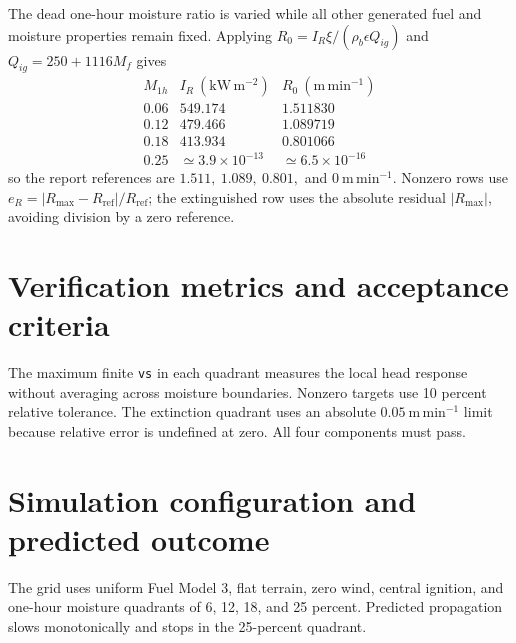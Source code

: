 The dead one-hour moisture ratio is varied while all other generated fuel
and moisture properties remain fixed.  Applying
\(R_0=I_R\xi/(\rho_b\epsilon Q_{ig})\) and
\(Q_{ig}=250+1116M_f\) gives
\[
\begin{array}{c|cc}
M_{1h}&I_R~(\mathrm{kW\,m^{-2}})&R_0~(\mathrm{m\,min^{-1}})\\
\hline
0.06&549.174&1.511830\\
0.12&479.466&1.089719\\
0.18&413.934&0.801066\\
0.25&\simeq3.9\times10^{-13}&\simeq6.5\times10^{-16}
\end{array}
\]
so the report references are \(1.511,\ 1.089,\ 0.801,\) and
\(0~\mathrm{m\,min^{-1}}\).  Nonzero rows use
\(e_R=|R_{\max}-R_{\mathrm{ref}}|/R_{\mathrm{ref}}\); the extinguished
row uses the absolute residual \(|R_{\max}|\), avoiding division by a
zero reference.

\section{Verification metrics and acceptance criteria}

The maximum finite \texttt{vs} in each quadrant measures the local head response without averaging across moisture boundaries. Nonzero targets use 10 percent relative tolerance. The extinction quadrant uses an absolute \(0.05~\mathrm{m\,min^{-1}}\) limit because relative error is undefined at zero. All four components must pass.

\section{Simulation configuration and predicted outcome}

The grid uses uniform Fuel Model 3, flat terrain, zero wind, central ignition, and one-hour moisture quadrants of 6, 12, 18, and 25 percent. Predicted propagation slows monotonically and stops in the 25-percent quadrant.

